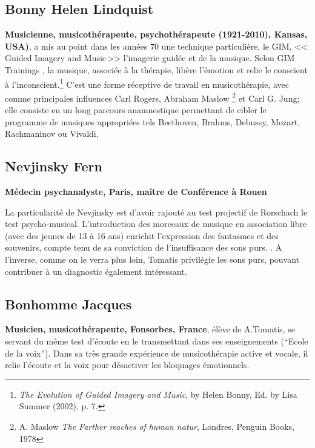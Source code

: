 \subsection{Bonny Helen Lindquist} 

\textbf{ Musicienne, musicothérapeute, psychothérapeute (1921-2010), Kansas, USA)},
a mis au point dans les années 70
une technique particulière, le GIM, <<\,Guided Imagery and Music\,>>
l'imagerie guidée et de la musique. Selon GIM
Trainings \autocite{gim_site}, la
musique, associée à la thérapie, libère l'émotion et relie le
conscient à l'inconscient.\footnote{\textsl{The Evolution of Guided Imagery and Music}, 
	by Helen Bonny, Ed. by Lisa Summer (2002), p. 7.}
 C'est une forme réceptive de travail
 en musicothérapie, avec comme principales influences Carl Rogers,
Abraham Maslow  \autocite{maslow-key}\footnote{A. Maslow\textit{  The Farther reaches of human natur}, Londres, Penguin
Books, 1978} et Carl G. Jung; 
elle  consiste en un long parcours  anamnestique permettant de cibler le programme de musiques appropriées tels Beethoven, Brahms, Debussy,
Mozart, Rachmaninov ou Vivaldi.

\subsection{ Nevjinsky Fern}
\textbf{Médecin psychanalyste, 
  Paris, maître de Conférence à Rouen}

 La particularité de Nevjinsky est d'avoir rajouté au test projectif de Rorschach le test psycho-musical.
L'introduction des morceaux de musique en association libre (avec
 des jeunes de 13 à 16 ans) enrichit l'expression des fantasmes et des
 souvenirs, compte tenu de sa conviction de l'insuffisance des sons purs. 
\autocite[Fern Nevjinsky, maître de conférences à l'Université de Rouen, musicien, psycho-analyste. 
``\textit{Comparaison des modalités de projection et d'expression au test de Rorschach et à un test psycho-musical pour des adolescents de 13 à 16 ans}''.]{nevjinsky:adolescence}.  
A l'inverse, comme on le verra plus loin, Tomatis
privilégie les sons purs,  pouvant contribuer à un diagnostic également intéressant.

 

  \subsection{ Bonhomme Jacques } 
  \textbf{Musicien, musicothérapeute,
    Fonsorbes, France}, élève de A.Tomatis, se servant du même test
  d'écoute en le transmettant dans ses enseignements (``Ecole de la
  voix''). Dans sa très grande expérience de musicothérapie active et
  vocale, il relie l'écoute et la voix pour désactiver les bloquages
  émotionnels.

